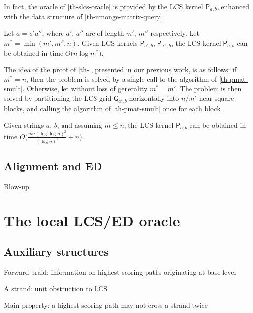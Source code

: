 \documentclass[a4paper,UKenglish,cleveref]{lipics-v2021}
\newcommand{\R}{\mathsf}
\newcommand{\bigpa}[1]{\bigl(#1\bigr)}
\newcommand{\rP}{\mathsf P}
\begin{document}
In fact, the oracle of \cref{th-slcs-oracle} is provided by the LCS kernel $\rP_{a,b}$,
enhanced with the data structure of \cref{th-umonge-matrix-query}.

\begin{theorem}
\label{th-}
%
Let $a = a'a''$, where $a'$, $a''$ are of length $m'$, $m''$ respectively.
Let $m^* = \min(m',m'',n)$.
Given LCS kernels $\rP_{a',b}$, $\rP_{a'',b}$, the LCS kernel $\rP_{a,b}$
can be obtained in time $O\bigpa{n \log m^*}$.
%
\end{theorem}

The idea of the proof of \cref{th-}, presented in our previous work, is as follows:
if $m^* = n$, then the problem is solved by a single call 
to the algorithm of \cref{th-pmat-smult}.
Otherwise, let without loss of generality $m^* = m'$.
The problem is then solved by partitioning the LCS grid $\R G_{a',b}$
horizontally into $n/m'$ near-square blocks, and calling 
the algorithm of \cref{th-pmat-smult} once for each block.

\begin{theorem}
\label{th-slcs-mbs}
%
Given strings $a$, $b$, and assuming $m \leq n$, the LCS kernel $\rP_{a,b}$
can be obtained in time $O\bigpa{\frac{mn (\log\log n)^2}{(\log n)^2} + n}$.
%
\end{theorem}

\subsection{Alignment and ED}
\label{ss-align}

Blow-up

\section{The local LCS/ED oracle}
\label{s-llcs}

\subsection{Auxiliary structures}

Forward braid: information on highest-scoring paths originating at base level

A strand: unit obstruction to LCS

Main property: a highest-scoring path may not cross a strand twice
\end{document}

